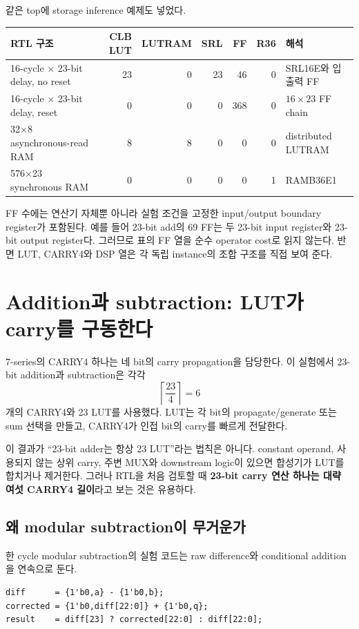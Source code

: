 \newpage
같은 top에 storage inference 예제도 넣었다.

\begin{longtable}{L{48mm}r r r r r L{37mm}}
\toprule
RTL 구조 & CLB LUT & LUTRAM & SRL & FF & R36 & 해석 \\
-cycle $\times$ 23-bit delay, no reset & 23 & 0 & 23 & 46 & 0 & SRL16E와 입출력 FF \\
16-cycle $\times$ 23-bit delay, reset & 0 & 0 & 0 & 368 & 0 & $16\times23$ FF chain \\
32$\times$8 asynchronous-read RAM & 8 & 8 & 0 & 0 & 0 & distributed LUTRAM \\
576$\times$23 synchronous RAM & 0 & 0 & 0 & 0 & 1 & RAMB36E1 \\
\bottomrule
\end{longtable}

FF 수에는 연산기 자체뿐 아니라 실험 조건을 고정한 input/output boundary
register가 포함된다. 예를 들어 23-bit add의 69 FF는 두 23-bit input register와
23-bit output register다. 그러므로 표의 FF 열을 순수 operator cost로 읽지
않는다. 반면 LUT, CARRY4와 DSP 열은 각 독립 instance의 조합 구조를 직접
보여 준다.

\section{Addition과 subtraction: LUT가 carry를 구동한다}

7-series의 CARRY4 하나는 네 bit의 carry propagation을 담당한다. 이 실험에서
23-bit addition과 subtraction은 각각
\[
\left\lceil\frac{23}{4}\right\rceil=6
\]
개의 CARRY4와 23 LUT를 사용했다. LUT는 각 bit의 propagate/generate 또는
sum 선택을 만들고, CARRY4가 인접 bit의 carry를 빠르게 전달한다.

이 결과가 “23-bit adder는 항상 23 LUT”라는 법칙은 아니다. constant operand,
사용되지 않는 상위 carry, 주변 MUX와 downstream logic이 있으면 합성기가
LUT를 합치거나 제거한다. 그러나 RTL을 처음 검토할 때
\textbf{23-bit carry 연산 하나는 대략 여섯 CARRY4 길이}라고 보는 것은 유용하다.

\subsection{왜 modular subtraction이 무거운가}

한 cycle modular subtraction의 실험 코드는 raw difference와 conditional
addition을 연속으로 둔다.

\begin{lstlisting}
diff      = {1'b0,a} - {1'b0,b};
corrected = {1'b0,diff[22:0]} + {1'b0,q};
result    = diff[23] ? corrected[22:0] : diff[22:0];
\end{lstlisting}

